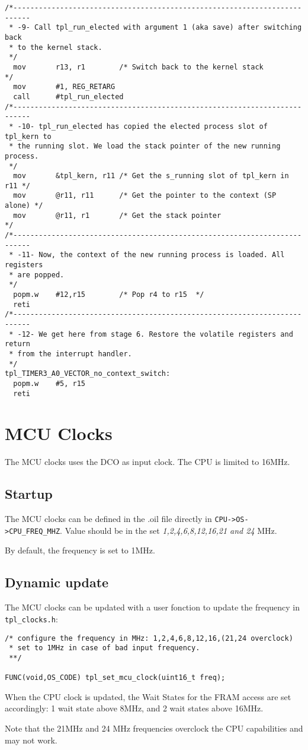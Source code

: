 \documentclass[11pt, oneside]{article}   	%
\begin{document}
\begin{lstlisting}[basicstyle=\footnotesize\ttfamily]
/*--------------------------------------------------------------------------
 * -9- Call tpl_run_elected with argument 1 (aka save) after switching back
 * to the kernel stack.
 */
  mov       r13, r1        /* Switch back to the kernel stack           */
  mov       #1, REG_RETARG
  call      #tpl_run_elected
/*--------------------------------------------------------------------------
 * -10- tpl_run_elected has copied the elected process slot of tpl_kern to
 * the running slot. We load the stack pointer of the new running process.
 */
  mov       &tpl_kern, r11 /* Get the s_running slot of tpl_kern in r11 */
  mov       @r11, r11      /* Get the pointer to the context (SP alone) */
  mov       @r11, r1       /* Get the stack pointer                     */
/*--------------------------------------------------------------------------
 * -11- Now, the context of the new running process is loaded. All registers
 * are popped.
 */
  popm.w    #12,r15        /* Pop r4 to r15  */
  reti
/*--------------------------------------------------------------------------
 * -12- We get here from stage 6. Restore the volatile registers and return
 * from the interrupt handler.
 */
tpl_TIMER3_A0_VECTOR_no_context_switch:
  popm.w    #5, r15
  reti
\end{lstlisting}

\section{MCU Clocks}
The MCU clocks uses the DCO as input clock. The CPU is limited to 16MHz. 

\subsection{Startup}
The MCU clocks can be defined in the .oil file directly in \texttt{CPU->OS->CPU\_FREQ\_MHZ}. Value should be in the set \emph{1,2,4,6,8,12,16,21 and 24} MHz.

By default, the frequency is set to 1MHz.

\subsection{Dynamic update}
The MCU clocks can be updated with a user fonction to update the frequency in \lstinline{tpl_clocks.h}:

\begin{lstlisting}
/* configure the frequency in MHz: 1,2,4,6,8,12,16,(21,24 overclock)
 * set to 1MHz in case of bad input frequency.
 **/

FUNC(void,OS_CODE) tpl_set_mcu_clock(uint16_t freq);
\end{lstlisting}

When the CPU clock is updated, the Wait States for the FRAM access are set accordingly: 1 wait state above 8MHz, and 2 wait states above 16MHz.

Note that the 21MHz and 24 MHz frequencies overclock the CPU capabilities and may not work.



\end{document}
